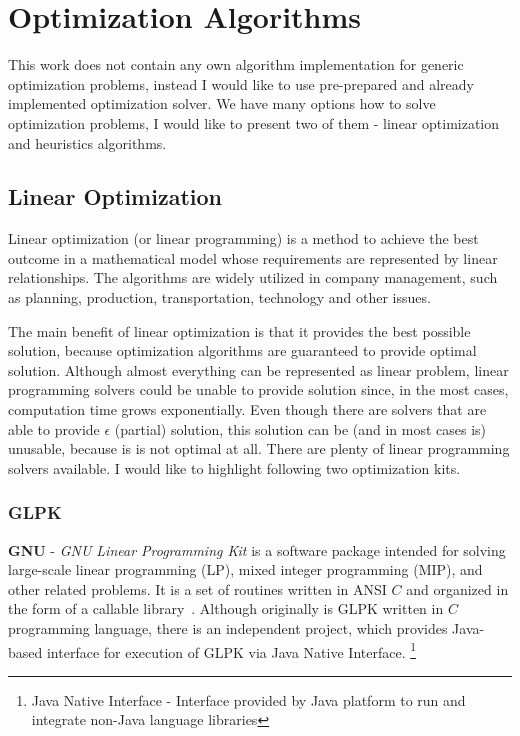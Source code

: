 
\section{Optimization Algorithms}\label{sec:optimization-algorithms}

This work does not contain any own algorithm implementation for generic optimization problems,
instead I would like to use pre-prepared and already implemented optimization solver.
We have many options how to solve optimization problems, I would like to present two of them
- linear optimization and heuristics algorithms.

\subsection{Linear Optimization}\label{subsec:linear-optimization}
Linear optimization (or linear programming) is a method to achieve the best outcome in a mathematical model
whose requirements are represented by linear relationships.\cite{web_wiki:linearProgramming}
The algorithms are widely utilized in company management, such as planning, production, transportation, technology and other issues.

The main benefit of linear optimization is that it provides the best possible solution,
because optimization algorithms are guaranteed to provide optimal solution.
Although almost everything can be represented as linear problem,
linear programming solvers could be unable to provide solution since, in the most cases, computation time grows exponentially.
Even though there are solvers that are able to provide $\epsilon$ (partial) solution,
this solution can be (and in most cases is) unusable, because is is not optimal at all.\newline
There are plenty of linear programming solvers available.
I would like to highlight following two optimization kits.

\subsubsection{GLPK}
\textbf{GNU} - \textit{GNU Linear Programming Kit} is a software package intended for solving large-scale linear programming (LP),
mixed integer programming (MIP), and other related problems.
It is a set of routines written in ANSI $C$ and organized in the form of a callable library~\cite{web:gnuGlpk}.
Although originally is GLPK written in $C$ programming language,
there is an independent project,
which provides Java-based interface for execution of GLPK via Java Native Interface.
\footnote{Java Native Interface - Interface provided by Java platform to run and integrate non-Java language libraries}

